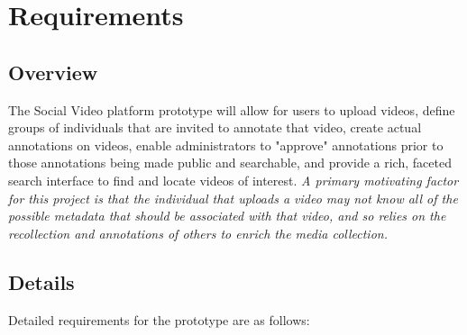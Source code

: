 %
\chapter{Requirements}
\label{sec:requirements}

\section{Overview}
\label{sec:requirements:overview}

The Social Video platform prototype will allow for users to upload videos, define groups of individuals that are invited to annotate that video, create actual annotations on videos, enable administrators to "approve" annotations prior to those annotations being made public and searchable, and provide a rich, faceted search interface to find and locate videos of interest.  \textit{A primary motivating factor for this project is that the individual that uploads a video may not know all of the possible metadata that should be associated with that video, and so relies on the recollection and annotations of others to enrich the media collection.}  

\section{Details}
\label{sec:requirements:details}

Detailed requirements for the prototype are as follows:

